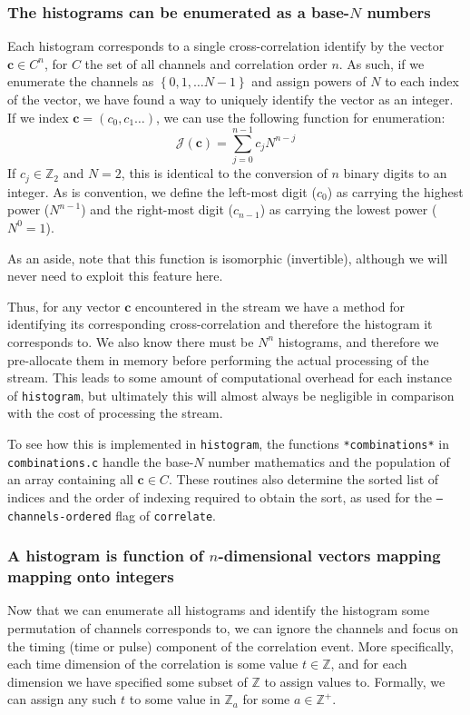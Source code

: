 \documentclass{article}
\newcommand{\braces}[1]{\ensuremath{\left\lbrace #1 \right\rbrace}}
\newcommand{\correlate}{\texttt{correlate}}
\newcommand{\histogram}{\texttt{histogram}}
\newcommand{\integers}{\ensuremath{\mathbb{Z}}}
\renewcommand{\vec}{\boldsymbol}
\newcommand{\channel}{\ensuremath{c}}
\newcommand{\channels}{\ensuremath{C}}
\newcommand{\Index}{\ensuremath{\mathcal{J}}}
\begin{document}
\subsubsection{The histograms can be enumerated as a base-$N$ numbers}
Each histogram corresponds to a single cross-correlation identify by the vector $\vec{\channel}\in\channels^{n}$, for $\channels$ the set of all channels and correlation order $n$. As such, if we enumerate the channels as $\braces{0,1,\ldots N-1}$ and assign powers of $N$ to each index of the vector, we have found a way to uniquely identify the vector as an integer. If we index $\vec{\channel}=(\channel_{0},\channel_{1}\ldots)$, we can use the following function for enumeration:
\begin{equation}
\Index(\vec{c}) = \sum_{j=0}^{n-1}{c_{j}N^{n-j}}
\end{equation}
If $c_{j}\in\integers_{2}$ and $N=2$, this is identical to the conversion of $n$ binary digits to an integer. As is convention, we define the left-most digit ($\channel_{0}$) as carrying the highest power ($N^{n-1}$) and the right-most digit ($\channel_{n-1}$) as carrying the lowest power ($N^{0}=1$).

As an aside, note that this function is isomorphic (invertible), although we will never need to exploit this feature here. 

Thus, for any vector $\vec{c}$ encountered in the stream we have a method for identifying its corresponding cross-correlation and therefore the histogram it corresponds to. We also know there must be $N^{n}$ histograms, and therefore we pre-allocate them in memory before performing the actual processing of the stream. This leads to some amount of computational overhead for each instance of \histogram, but ultimately this will almost always be negligible in comparison with the cost of processing the stream. 

To see how this is implemented in \histogram, the functions \texttt{*combinations*} in \texttt{combinations.c} handle the base-$N$ number mathematics and the population of an array containing all $\vec{\channel}\in\channels$. These routines also determine the sorted list of indices and the order of indexing required to obtain the sort, as used for the \texttt{--channels-ordered} flag of \correlate. 

\subsubsection{A histogram is function of $n$-dimensional vectors mapping mapping onto integers}
Now that we can enumerate all histograms and identify the histogram some permutation of channels corresponds to, we can ignore the channels and focus on the timing (time or pulse) component of the correlation event. More specifically, each time dimension of the correlation is some value $t\in\integers$, and for each dimension we have specified some subset of $\integers$ to assign values to. Formally, we can assign any such $t$ to some value in $\integers_{a}$ for some $a\in\integers^{+}$. 
\end{document}
